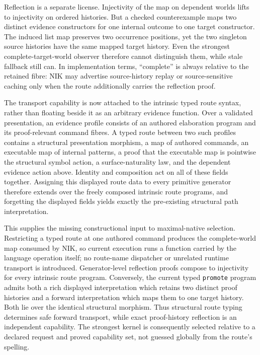 \documentclass[11pt]{article}
\newcommand{\code}[1]{\texttt{#1}}
\begin{document}
Reflection is a separate license.  Injectivity of the map on dependent worlds
lifts to injectivity on ordered histories.  But a checked counterexample maps
two distinct evidence constructors for one internal outcome to one target
constructor.  The induced list map preserves two occurrence positions, yet the
two singleton source histories have the same mapped target history.  Even the
strongest complete-target-world observer therefore cannot distinguish them,
while stale fallback still can.  In implementation terms, ``complete'' is
always relative to the retained fibre: NIK may advertise source-history replay
or source-sensitive caching only when the route additionally carries the
reflection proof.

The transport capability is now attached to the intrinsic typed route syntax,
rather than floating beside it as an arbitrary evidence function.  Over a
validated presentation, an evidence profile consists of an authored
elaboration program and its proof-relevant command fibres.  A typed route
between two such profiles contains a structural presentation morphism, a map
of authored commands, an executable map of internal patterns, a proof that the
executable map is pointwise the structural symbol action, a surface-naturality
law, and the dependent evidence action above.  Identity and composition act on
all of these fields together.  Assigning this displayed route data to every
primitive generator therefore extends over the freely composed intrinsic route
programs, and forgetting the displayed fields yields exactly the pre-existing
structural path interpretation.

This supplies the missing constructional input to maximal-native selection.
Restricting a typed route at one authored command produces the
complete-world map consumed by NIK, so current execution runs a function
carried by the language operation itself; no route-name dispatcher or unrelated
runtime transport is introduced.  Generator-level reflection proofs compose
to injectivity for every intrinsic route program.  Conversely, the current
typed \code{promote} program admits both a rich displayed interpretation which
retains two distinct proof histories and a forward interpretation which maps
them to one target history.  Both lie over the identical structural morphism.
Thus structural route typing determines safe forward transport, while exact
proof-history reflection is an independent capability.  The strongest kernel
is consequently selected relative to a declared request and proved capability
set, not guessed globally from the route's spelling.
\end{document}

